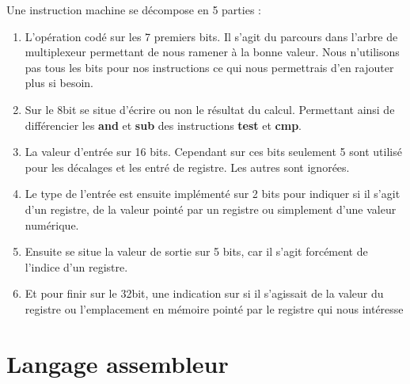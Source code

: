 \documentclass[10pt,a4paper,notitlepage ]{report}
\begin{document}
		Une instruction machine se décompose en 5 parties : 
		\begin{enumerate}
			\item L'opération codé sur les 7 premiers bits. Il s'agit du parcours dans l'arbre de multiplexeur permettant de nous ramener à la bonne valeur. Nous n'utilisons pas tous les bits pour nos instructions ce qui nous permettrais d'en rajouter plus si besoin.

			\item Sur le 8\ieme bit se situe d'écrire ou non le résultat du calcul. Permettant ainsi de différencier les \textbf{and} et \textbf{sub} des instructions \textbf{test} et \textbf{cmp}.

			\item La valeur d'entrée sur 16 bits. Cependant sur ces bits seulement 5 sont utilisé pour les décalages et les entré de registre. Les autres sont ignorées.

			\item Le type de l'entrée est ensuite implémenté sur 2 bits pour indiquer si il s'agit d'un registre, de la valeur pointé par un registre ou simplement d'une valeur numérique.

			\item Ensuite se situe la valeur de sortie sur 5 bits, car il s'agit forcément de l'indice d'un registre.

			\item Et pour finir sur le 32\ieme bit, une indication sur si il s'agissait de la valeur du registre ou l'emplacement en mémoire pointé par le registre qui nous intéresse
		\end{enumerate}


\section{Langage assembleur}
\end{document}
